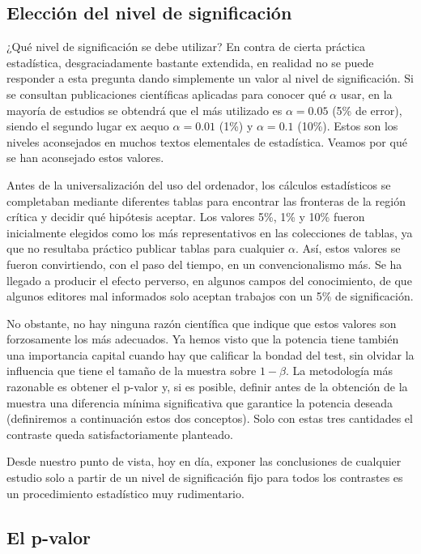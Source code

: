\documentclass[
]{article}
\begin{document}
\subsection{Elección del nivel de significación}\label{elecciuxf3n-del-nivel-de-significaciuxf3n}

¿Qué nivel de significación se debe utilizar? En contra de cierta práctica estadística, desgraciadamente bastante extendida, en realidad no se puede responder a esta pregunta dando simplemente un valor al nivel de significación. Si se consultan publicaciones científicas aplicadas para conocer qué \(\alpha\) usar, en la mayoría de estudios se obtendrá que el más utilizado es \(\alpha=0.05\) (5\% de error), siendo el segundo lugar ex aequo \(\alpha=0.01\) (1\%) y \(\alpha=0.1\) (10\%). Estos son los niveles aconsejados en muchos textos elementales de estadística. Veamos por qué se han aconsejado estos valores.

Antes de la universalización del uso del ordenador, los cálculos estadísticos se completaban mediante diferentes tablas para encontrar las fronteras de la región crítica y decidir qué hipótesis aceptar. Los valores 5\%, 1\% y 10\% fueron inicialmente elegidos como los más representativos en las colecciones de tablas, ya que no resultaba práctico publicar tablas para cualquier \(\alpha\). Así, estos valores se fueron convirtiendo, con el paso del tiempo, en un convencionalismo más. Se ha llegado a producir el efecto perverso, en algunos campos del conocimiento, de que algunos editores mal informados solo aceptan trabajos con un 5\% de significación.

No obstante, no hay ninguna razón científica que indique que estos valores son forzosamente los más adecuados. Ya hemos visto que la potencia tiene también una importancia capital cuando hay que calificar la bondad del test, sin olvidar la influencia que tiene el tamaño de la muestra sobre \(1-\beta\). La metodología más razonable es obtener el p-valor y, si es posible, definir antes de la obtención de la muestra una diferencia mínima significativa que garantice la potencia deseada (definiremos a continuación estos dos conceptos). Solo con estas tres cantidades el contraste queda satisfactoriamente planteado.

Desde nuestro punto de vista, hoy en día, exponer las conclusiones de cualquier estudio solo a partir de un nivel de significación fijo para todos los contrastes es un procedimiento estadístico muy rudimentario.

\subsection{El p-valor}\label{el-p-valor}
\end{document}
